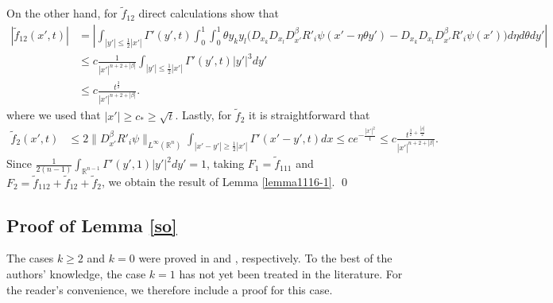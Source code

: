 \documentclass{amsart}
\numberwithin{equation}{section}
\newcommand{\R}{{ \mathbb R}^n}
\newcommand {\be}{\beta}
\newcommand{\Rn}{{\mathbb R}^{n-1}}
\newcommand{\te}{\theta}
\newcommand{\Ga}{\Gamma}
\begin{document}
On the other hand, for  $\tilde f_{12}$ direct calculations show that
\begin{align*}
|\tilde f_{12}(x',t)| & =  \left| \int_{|y'| \leq \frac12 |x'|} \Ga'(y',t) \int_0^1 \int_0^1 \te y_k y_l \Big( D_{x_k} D_{x_l}   D_{x'}^\be R'_i \psi (x' -\eta \theta y') - D_{x_k} D_{x_l}   
                                             D_{x'}^\be R'_i \psi (x') \Big) d\eta d\theta dy' \right|\\
& \leq c \frac{1}{|x'|^{n+2 + |\be|}} \int_{|y'| \leq \frac12 |x'|} \Ga'(y',t) |y'|^3 dy' \\
& \leq c \frac{t^{\frac32}}{|x'|^{n+2 +|\be|}}. %
\end{align*}
where we used that $|x'| \geq c_* \geq \sqrt{t} $.
Lastly, for $\tilde f_2$ it is straightforward that 
\begin{align*}
\tilde f_2(x',t) & \leq     2  \| D^\be_{x'} R'_i \psi\|_{L^\infty (\R)} \int_{|x' -y'| \geq \frac12|x'|} \Ga' (x' -y', t)  dx \leq c e^{-\frac{|x'|^2}t}\leq   c \frac{t^{\frac32+\frac{|\be|}2 }}{|x'|^{n+2 +|\be|}}.
\end{align*}
Since $\frac1{2(n-1)}  \int_{\Rn }\Ga'( y',1)   | y'|^2   dy'  =1$, taking   $ F_1 = \tilde f_{111}$ and $ F_2 =  \tilde f_{112}   +  \tilde f_{12}  + \tilde f_2$,  we obtain the result of  Lemma \ref{lemma1116-1}.
\qed
 


\subsection{Proof of Lemma \ref{so}}\label{existenceofsolution2} 




 
The cases $k\ge 2$ and $k=0$ were proved in \cite{S02} and \cite{CJ2}, respectively. To the best of the authors' knowledge, the case $k=1$ has not yet been treated in the literature. For the reader's convenience, we therefore include a proof for this case.
 
\end{document}
